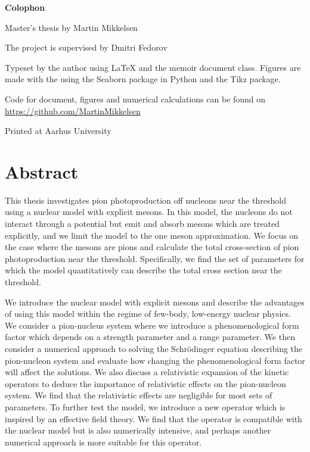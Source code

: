 
\edef\fontandleading{\@memptsize.0/\the\baselineskip}
\makeatother
\thispagestyle{empty}
\strut\vfill
{
	\setlength{\parindent}{0pt}
	\addtolength{\parskip}{.6em}
	
	\begin{center}
		\bfseries\sffamily Colophon
	\end{center}
	
	\small
	
	\textsl{\projecttitle}
	
	\smallskip
	
	Master's thesis by Martin Mikkelsen
	
	The project is supervised by Dmitri Fedorov
	
	Typeset by the author using \LaTeX{} and the \textsf{memoir} document class. Figures are made with the using the Seaborn package in Python and the Tikz package.
	
	Code for document, figures and numerical calculations can be found on \url{https://github.com/MartinMikkelsen}
	
	Printed at Aarhus University
}
\frontmatter
\section*{Abstract}

This thesis investigates pion photoproduction off nucleons near the threshold using a nuclear model with explicit mesons. In this model, the nucleons do not interact through a potential but emit and absorb mesons which are treated explicitly, and we limit the model to the one meson approximation. We focus on the case where the mesons are pions and calculate the total cross-section of pion photoproduction near the threshold. Specifically, we find the set of parameters for which the model quantitatively can describe the total cross section near the threshold. 

We introduce the nuclear model with explicit mesons and describe the advantages of using this model within the regime of few-body, low-energy nuclear physics. We consider a pion-nucleus system where we introduce a phenomenological form factor which depends on a strength parameter and a range parameter. We then consider a numerical approach to solving the Schrödinger equation describing the pion-nucleon system and evaluate how changing the phenomenological form factor will affect the solutions. We also discuss a relativistic expansion of the kinetic operators to deduce the importance of relativistic effects on the pion-nucleon system. We find that the relativistic effects are negligible for most sets of parameters. To further test the model, we introduce a new operator which is inspired by an effective field theory. We find that the operator is compatible with the nuclear model but is also numerically intensive, and perhaps another numerical approach is more suitable for this operator.

